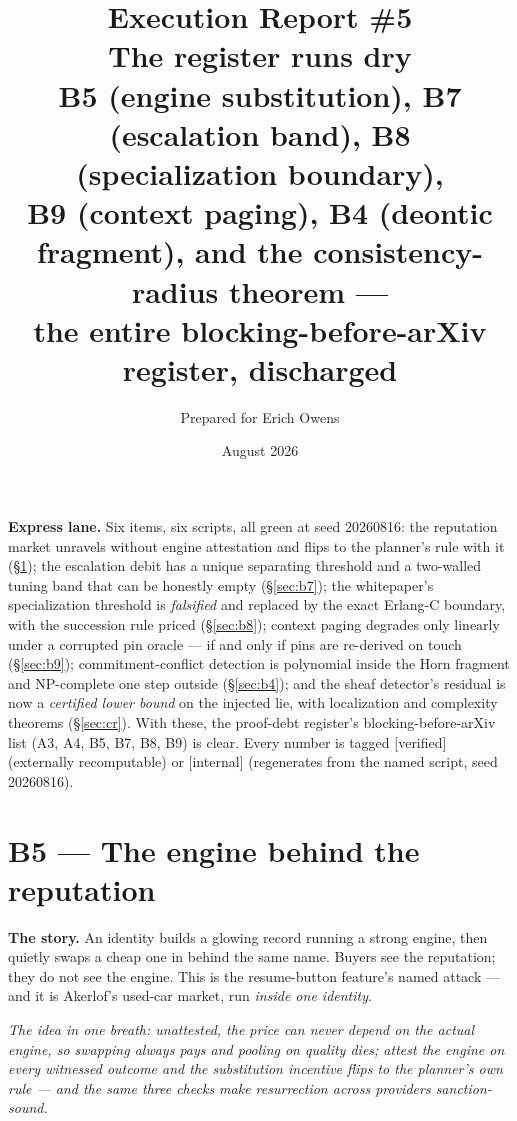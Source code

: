\documentclass[11pt,a4paper]{article}
\title{\textbf{Execution Report \#5}\\[4pt]
\large The register runs dry\\[3pt]
\normalsize B5 (engine substitution), B7 (escalation band), B8 (specialization boundary),\\
B9 (context paging), B4 (deontic fragment), and the consistency-radius theorem ---\\
the entire blocking-before-arXiv register, discharged}
\author{Prepared for Erich Owens}
\date{August 2026}
\newcommand{\onebreath}[1]{\begin{center}\emph{#1}\end{center}}
\begin{document}
\maketitle

\noindent\textbf{Express lane.} Six items, six scripts, all green at seed 20260816: the reputation market unravels without engine attestation and flips to the planner's rule with it (\S\ref{sec:b5}); the escalation debit has a unique separating threshold and a two-walled tuning band that can be honestly empty (\S\ref{sec:b7}); the whitepaper's specialization threshold is \emph{falsified} and replaced by the exact Erlang-C boundary, with the succession rule priced (\S\ref{sec:b8}); context paging degrades only linearly under a corrupted pin oracle --- if and only if pins are re-derived on touch (\S\ref{sec:b9}); commitment-conflict detection is polynomial inside the Horn fragment and NP-complete one step outside (\S\ref{sec:b4}); and the sheaf detector's residual is now a \emph{certified lower bound} on the injected lie, with localization and complexity theorems (\S\ref{sec:cr}). With these, the proof-debt register's blocking-before-arXiv list (A3, A4, B5, B7, B8, B9) is clear. Every number is tagged [verified] (externally recomputable) or [internal] (regenerates from the named script, seed 20260816).

\section{B5 --- The engine behind the reputation}\label{sec:b5}
\textbf{The story.} An identity builds a glowing record running a strong engine, then quietly swaps a cheap one in behind the same name. Buyers see the reputation; they do not see the engine. This is the resume-button feature's named attack --- and it is Akerlof's used-car market, run \emph{inside one identity}.

\onebreath{The idea in one breath: unattested, the price can never depend on the actual engine, so swapping always pays and pooling on quality dies; attest the engine on every witnessed outcome and the substitution incentive flips to the planner's own rule --- and the same three checks make resurrection across providers sanction-sound.}
\end{document}

